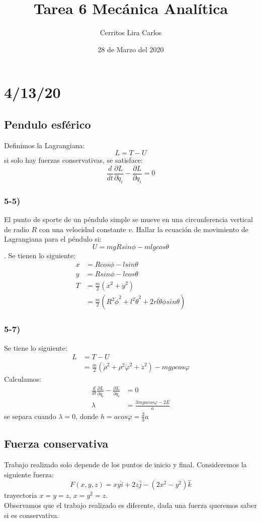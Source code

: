 \documentclass{article}
\title{Tarea 6 Mecánica Analítica}
\author{Cerritos Lira Carlos}
\date{28 de Marzo del 2020}
\begin{document}
\section*{4/13/20}
\subsection*{Pendulo esférico}
Definimos la Lagrangiana:
\[L = T-U \]
si solo hay fuerzas conservativas, se satisface:
\[ \frac{d}{dt}\frac{\partial L}{\partial \dot{q}_i} - \frac{\partial L}{\partial q_i} = 0\]
\begin{tcolorbox}
    \subsubsection*{5-5)}
    El punto de sporte de un péndulo simple se mueve en una circunferencia
    vertical de radio $R$ con una velocidad constante $v$. Hallar la ecuación 
    de movimiento de Lagrangiana para el péndulo si:
    \[ U = mgRsin\phi -mlgcos\theta \].
    Se tienen lo siguiente:
    \begin{align*}
        x &= Rcos\phi - lsin\theta \\
        y &= Rsin\phi - lcos\theta \\ 
        T 
        &= \frac{m}{2} (\dot{x}^2 + \dot{y}^2) \\
        &= \frac{m}{2} ( R^2 \dot{\phi}^2 + l^2 \dot{\theta}^2 + 2rl\dot{\theta}\dot{\phi}sin\theta)
    \end{align*}
    \subsubsection*{5-7)}
    Se tiene lo siguiente:
    \begin{align*}
        L 
        &= T-U \\
        &= \frac{m}{2} (\dot{\rho}^2 + \rho^2 \dot{\varphi}^2 + \dot{z}^2)-mg\rho cos\varphi
    \end{align*}
    Calculamos:
    \begin{align*}
        \frac{d}{dt}\frac{\partial L}{\partial \dot{q}_i} - \frac{\partial L}{\partial q_i} &= 0 \\
        \lambda &= \frac{3mgacos\varphi - 2E}{a}
    \end{align*}
    se separa cuando $\lambda = 0$, donde $h= acos\varphi = \frac{2}{3}a$
\end{tcolorbox}
\subsection*{Fuerza conservativa}
Trabajo realizado solo depende de los puntos de inicio y final.
Consideremos la siguiente fuerza:
\[ F(x,y,z) = xy\hat{i} + 2z\hat{j} - (2x^2-y^2)\hat{k} \]
trayectoria $x=y=z$, $x=y^2=z$. \\
Observamos que el trabajo realizado es diferente, dada una fuerza queremos saber 
si es conservativa. 
\end{document}
